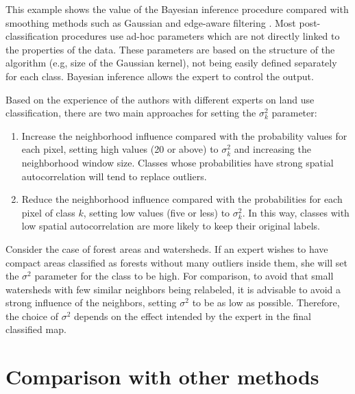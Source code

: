 \documentclass[
  shortnames]{jss}
\begin{document}
This example shows the value of the Bayesian inference procedure compared with smoothing methods such as Gaussian and edge-aware filtering \citep{Schindler2012}. Most post-classification procedures use ad-hoc parameters which are not directly linked to the properties of the data. These parameters are based on the structure of the algorithm (e.g, size of the Gaussian kernel), not being easily defined separately for each class. Bayesian inference allows the expert to control the output.

Based on the experience of the authors with different experts on land use classification, there are two main approaches for setting the \(\sigma^2_{k}\) parameter:

\begin{enumerate}
\def\labelenumi{\arabic{enumi}.}
\item
  Increase the neighborhood influence compared with the probability values for each pixel, setting high values (20 or above) to \(\sigma^2_{k}\) and increasing the neighborhood window size. Classes whose probabilities have strong spatial autocorrelation will tend to replace outliers.
\item
  Reduce the neighborhood influence compared with the probabilities for each pixel of class \(k\), setting low values (five or less) to \(\sigma^2_{k}\). In this way, classes with low spatial autocorrelation are more likely to keep their original labels.
\end{enumerate}

Consider the case of forest areas and watersheds. If an expert wishes to have compact areas classified as forests without many outliers inside them, she will set the \(\sigma^2\) parameter for the class  to be high. For comparison, to avoid that small watersheds with few similar neighbors being relabeled, it is advisable to avoid a strong influence of the neighbors, setting \(\sigma^2\) to be as low as possible. Therefore, the choice of \(\sigma^2\) depends on the effect intended by the expert in the final classified map.

\hypertarget{comparison-with-other-methods}{%
\section{Comparison with other methods}\label{comparison-with-other-methods}}

\renewcommand\refname{Conclusion}

\end{document}
